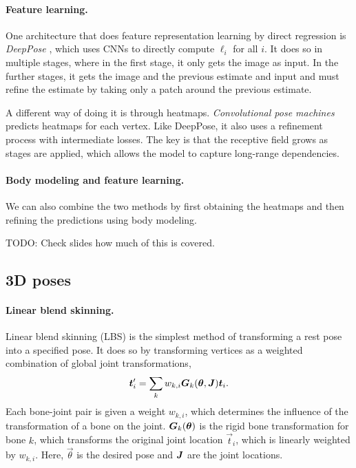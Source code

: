 \paragraph{Feature learning.}

One architecture that does feature representation learning by direct regression is
\textit{DeepPose} \citep{toshev2014deeppose}, which uses CNNs to directly compute $\ell_i$ for all
$i$. It does so in multiple stages, where in the first stage, it only gets the image as input. In
the further stages, it gets the image and the previous estimate and input and must refine the
estimate by taking only a patch around the previous estimate.

A different way of doing it is through heatmaps. \textit{Convolutional pose machines}
\citep{wei2016convolutional} predicts heatmaps for each vertex. Like DeepPose, it also uses a
refinement process with intermediate losses. The key is that the receptive field grows as stages
are applied, which allows the model to capture long-range dependencies.

\paragraph{Body modeling and feature learning.}

We can also combine the two methods by first obtaining the heatmaps and then refining the
predictions using body modeling.

TODO: Check slides how much of this is covered.

\subsection{3D poses}

\paragraph{Linear blend skinning.}

Linear blend skinning (LBS) is the simplest method of transforming a rest pose into a specified
pose. It does so by transforming vertices as a weighted combination of global joint
transformations, \[
    \bm{t}_i' = \sum_{k} w_{k,i} \bm{G}_k(\bm{\theta}, \bm{J}) \bm{t}_i.
\]
Each bone-joint pair is given a weight $w_{k,i}$, which determines the influence of the
transformation of a bone on the joint. $\bm{G}_k(\bm{\theta})$ is the rigid bone transformation
for bone $k$, which transforms the original joint location $\vec{t}_i$, which is linearly weighted
by $w_{k,i}$. Here, $\vec{\theta}$ is the desired pose and $\bm{J}$ are the joint locations.


